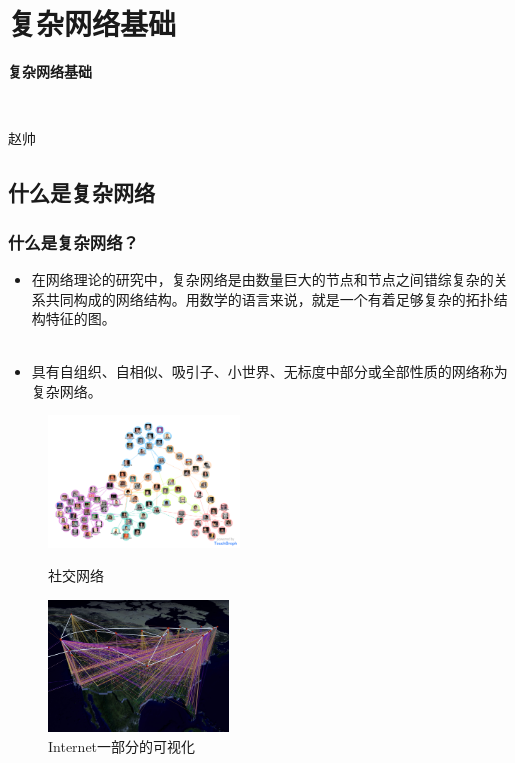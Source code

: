\section*{复杂网络基础}

\begin{frame}
	\centerline{\textbf{\Large{复杂网络基础}}} 
	~\\
	\centerline{\large{赵帅}}
\end{frame}

\subsection*{什么是复杂网络}

	\begin{frame}
		\frametitle{什么是复杂网络？}
	
		\begin{itemize}
		\item 在网络理论的研究中，复杂网络是由数量巨大的节点和节点之间错综复杂的关系共同构成的网络结构。用数学的语言来说，就是一个有着足够复杂的拓扑结构特征的图。 \\ ~\\
		\item 具有自组织、自相似、吸引子、小世界、无标度中部分或全部性质的网络称为复杂网络。
		\end{itemize}
	
	\end{frame}



	\begin{frame}
	
		\begin{figure}[htbp]
			\centering
			\begin{minipage}[t]{0.45\textwidth}
				\centering
				\includegraphics[height=3.5cm]{pic/01-social.png}
				\caption{社交网络}
			\end{minipage}
			\begin{minipage}[t]{0.45\textwidth}
				\centering
				\includegraphics[height=3.5cm]{pic/01-internet.jpg}
				\caption{Internet一部分的可视化}
			\end{minipage}
		\end{figure}
	
	\end{frame}


